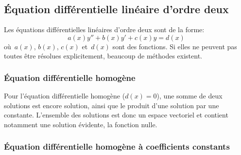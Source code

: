 \medskip
\subsection{Équation différentielle linéaire d'ordre deux} 

Les équations différentielles linéaires d'ordre deux sont de la forme:
\begin{equation}
a(x)y'' + b(x)y' + c(x)y = d(x)
\end{equation}
où~$a(x)$, $b(x)$, $c(x)$ et~$d(x)$ sont des fonctions. Si elles ne peuvent pas toutes être résolues explicitement, beaucoup de méthodes existent. 

\medskip
\subsubsection{Équation différentielle homogène} 

Pour l'équation différentielle homogène ($d(x)=0$), une somme de deux solutions est encore solution, ainsi que le produit d'une solution par une constante. L'ensemble des solutions est donc un espace vectoriel et contient notamment une solution évidente, la fonction nulle. 

\medskip
\subsubsection{Équation différentielle homogène à coefficients constants} 

